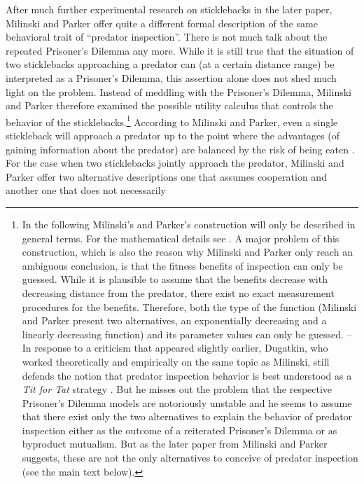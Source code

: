 After much further experimental research on sticklebacks in the later paper, 
Milinski and Parker offer quite a different formal description of the same
behavioral trait of ``predator inspection''. There is not much talk about the
repeated Prisoner's Dilemma any more. While it is still true that the
situation of two sticklebacks approaching a predator can (at a certain
distance range) be interpreted as a Prisoner's Dilemma, this assertion alone
does not shed much light on the problem. Instead of meddling with the
Prisoner's Dilemma, Milinski and Parker therefore examined the possible
utility calculus that controls the behavior of the sticklebacks.\footnote{In
  the following Milinski's and Parker's construction will only be described in
  general terms. For the mathematical details see \cite{milinski-parker:1997}.
  A major problem of this construction, which is also the reason why Milinski
  and Parker only reach an ambiguous conclusion, is that the fitness benefits
  of inspection can only be guessed. While it is plausible to assume that the
  benefits decrease with decreasing distance from the predator, there exist
  no exact measurement procedures for the benefits. Therefore, both the type of
the function (Milinski and Parker present two alternatives, an exponentially
  decreasing and a linearly decreasing function) and its parameter values can
  only be guessed. -- In response to a criticism that appeared slightly
  earlier, Dugatkin, who worked theoretically and empirically on the same topic
  as Milinski, still defends the notion that predator inspection behavior is
  best understood as a {\em Tit for Tat} strategy \cite[]{dugatkin:1996}. But
  he misses out the problem that the respective Prisoner's Dilemma models are
  notoriously unstable and he seems to assume that there exist only the two
  alternatives to explain the behavior of predator inspection either as the
  outcome of a reiterated Prisoner's Dilemma or as byproduct mutualism. But
  as the later paper from Milinski and Parker \cite[]{milinski-parker:1997}
  suggests, these are not the only alternatives to conceive of predator
  inspection (see the main text below).} According to Milinski and Parker,
even a single stickleback will approach a predator up to the point where the
advantages (of gaining information about the predator) are balanced by the
risk of being eaten \cite[p.\  1241/1242]{milinski-parker:1997}. For the case
when two sticklebacks jointly approach the predator, Milinski and Parker offer
two alternative descriptions one that assumes cooperation \cite[p.\ 
1242]{milinski-parker:1997} and another one that does not necessarily
